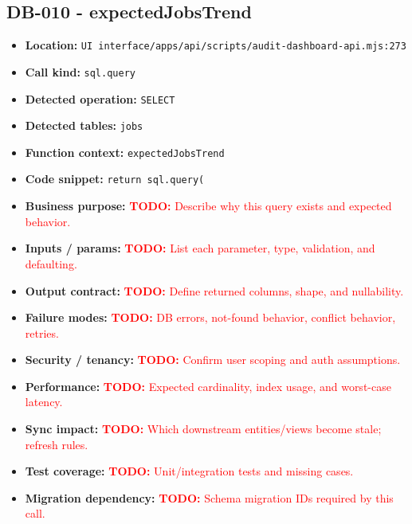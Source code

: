 \documentclass[11pt]{article}
\newcommand{\todoitem}[1]{\textcolor{red}{\textbf{TODO:} #1}}
\begin{document}
\subsection{DB-010 - expectedJobsTrend}
\begin{itemize}[leftmargin=1.5em]
\item \textbf{Location:} \texttt{UI interface/apps/api/scripts/audit-dashboard-api.mjs:273}
\item \textbf{Call kind:} \texttt{sql.query}
\item \textbf{Detected operation:} \texttt{SELECT}
\item \textbf{Detected tables:} \texttt{jobs}
\item \textbf{Function context:} \texttt{expectedJobsTrend}
\item \textbf{Code snippet:} \texttt{return sql.query(}
\item \textbf{Business purpose:} \todoitem{Describe why this query exists and expected behavior.}
\item \textbf{Inputs / params:} \todoitem{List each parameter, type, validation, and defaulting.}
\item \textbf{Output contract:} \todoitem{Define returned columns, shape, and nullability.}
\item \textbf{Failure modes:} \todoitem{DB errors, not-found behavior, conflict behavior, retries.}
\item \textbf{Security / tenancy:} \todoitem{Confirm user scoping and auth assumptions.}
\item \textbf{Performance:} \todoitem{Expected cardinality, index usage, and worst-case latency.}
\item \textbf{Sync impact:} \todoitem{Which downstream entities/views become stale; refresh rules.}
\item \textbf{Test coverage:} \todoitem{Unit/integration tests and missing cases.}
\item \textbf{Migration dependency:} \todoitem{Schema migration IDs required by this call.}
\end{itemize}
\end{document}
